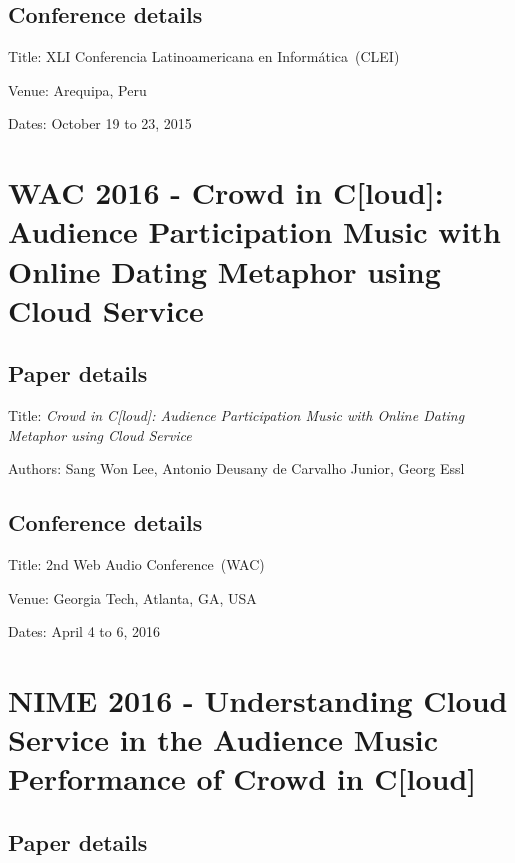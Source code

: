 \subsection*{Conference details}

Title: XLI Conferencia Latinoamericana en Informática~(CLEI)

Venue: Arequipa, Peru

Dates: October 19 to 23, 2015



\section{WAC 2016 - Crowd in C[loud]: Audience Participation Music with Online Dating Metaphor using Cloud Service}
\label{ape:paperwac2016}

\subsection*{Paper details}

Title: \textit{Crowd in C[loud]: Audience Participation Music with Online Dating Metaphor using Cloud Service}

Authors: Sang Won Lee, Antonio Deusany de Carvalho Junior, Georg Essl

\subsection*{Conference details}

Title: 2nd Web Audio Conference~(WAC)

Venue: Georgia Tech, Atlanta, GA, USA

Dates: April 4 to 6, 2016



\section{NIME 2016 - Understanding Cloud Service in the Audience Music Performance of Crowd in C[loud]}
\label{ape:papernime2016}

\subsection*{Paper details}

